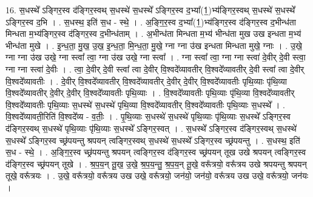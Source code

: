 \documentclass[17pt]{extarticle}
\begin{document}
16. स॒धस्थे᳚ ऽङ्गिर॒स्व द॑ङ्गिर॒स्वथ् स॒धस्थे॑ स॒धस्थे᳚ ऽङ्गिर॒स्व द॒भ्या᳚(1॒)भ्य॑ङ्गिर॒स्वथ् स॒धस्थे॑ स॒धस्थे᳚ ऽङ्गिर॒स्व द॒भि । . स॒धस्थ॒ इति॑ स॒ध - स्थे॒ । . अ॒ङ्गि॒र॒स्व द॒भ्या᳚(1॒)भ्य॑ङ्गिर॒स्व द॑ङ्गिर॒स्व द॒भीन्ध॑ता मिन्धता म॒भ्य॑ङ्गिर॒स्व द॑ङ्गिर॒स्व द॒भीन्ध॑ताम् । . अ॒भीन्ध॑ता मिन्धता म॒भ्य॑ भीन्ध॑ता मुख उख इन्धता म॒भ्य॑ भीन्ध॑ता मुखे । . इ॒न्ध॒ता॒ मु॒ख॒ उ॒ख॒ इ॒न्ध॒ता॒ मि॒न्ध॒ता॒ मु॒खे॒ ग्ना ग्ना उ॑ख इन्धता मिन्धता मुखे॒ ग्नाः । . उ॒खे॒ ग्ना ग्ना उ॑ख उखे॒ ग्ना स्त्वा᳚ त्वा॒ ग्ना उ॑ख उखे॒ ग्ना स्त्वा᳚ । . ग्ना स्त्वा᳚ त्वा॒ ग्ना ग्ना स्त्वा॑ दे॒वीर् दे॒वी स्त्वा॒ ग्ना ग्ना स्त्वा॑ दे॒वीः । . त्वा॒ दे॒वीर् दे॒वी स्त्वा᳚ त्वा दे॒वीर् वि॒श्वदे᳚व्यावतीर् वि॒श्वदे᳚व्यावतीर् दे॒वी स्त्वा᳚ त्वा दे॒वीर् वि॒श्वदे᳚व्यावतीः । . दे॒वीर् वि॒श्वदे᳚व्यावतीर् वि॒श्वदे᳚व्यावतीर् दे॒वीर् दे॒वीर् वि॒श्वदे᳚व्यावतीः पृथि॒व्याः पृ॑थि॒व्या वि॒श्वदे᳚व्यावतीर् दे॒वीर् दे॒वीर् वि॒श्वदे᳚व्यावतीः पृथि॒व्याः । . वि॒श्वदे᳚व्यावतीः पृथि॒व्याः पृ॑थि॒व्या वि॒श्वदे᳚व्यावतीर् वि॒श्वदे᳚व्यावतीः पृथि॒व्याः स॒धस्थे॑ स॒धस्थे॑ पृथि॒व्या वि॒श्वदे᳚व्यावतीर् वि॒श्वदे᳚व्यावतीः पृथि॒व्याः स॒धस्थे᳚ । . वि॒श्वदे᳚व्यावती॒रिति॑ वि॒श्वदे᳚व्य - व॒तीः॒ । . पृ॒थि॒व्याः स॒धस्थे॑ स॒धस्थे॑ पृथि॒व्याः पृ॑थि॒व्याः स॒धस्थे᳚ ऽङ्गिर॒स्व द॑ङ्गिर॒स्वथ् स॒धस्थे॑ पृथि॒व्याः पृ॑थि॒व्याः स॒धस्थे᳚ ऽङ्गिर॒स्वत् । . स॒धस्थे᳚ ऽङ्गिर॒स्व द॑ङ्गिर॒स्वथ् स॒धस्थे॑ स॒धस्थे᳚ ऽङ्गिर॒स्व च्छ्र॑पयन्तु श्रपयन् त्वङ्गिर॒स्वथ् स॒धस्थे॑ स॒धस्थे᳚ ऽङ्गिर॒स्व च्छ्र॑पयन्तु । . स॒धस्थ॒ इति॑ स॒ध - स्थे॒ । . अ॒ङ्गि॒र॒स्व च्छ्र॑पयन्तु श्रपयन् त्वङ्गिर॒स्व द॑ङ्गिर॒स्व च्छ्र॑पयन् तूख उखे श्रपयन् त्वङ्गिर॒स्व द॑ङ्गिर॒स्व च्छ्र॑पयन् तूखे । . श्र॒प॒य॒न् तू॒ख॒ उ॒खे॒ श्र॒प॒य॒न्तु॒ श्र॒प॒य॒न् तू॒खे॒ वरू᳚त्रयो॒ वरू᳚त्रय उखे श्रपयन्तु श्रपयन् तूखे॒ वरू᳚त्रयः । . उ॒खे॒ वरू᳚त्रयो॒ वरू᳚त्रय उख उखे॒ वरू᳚त्रयो॒ जन॑यो॒ जन॑यो॒ वरू᳚त्रय उख उखे॒ वरू᳚त्रयो॒ जन॑यः । \newline
\end{document}
